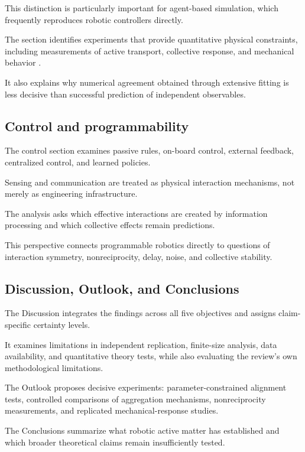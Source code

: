 This distinction is particularly important
for agent-based simulation, which frequently
reproduces robotic controllers directly.

The section identifies experiments
that provide quantitative physical
constraints, including measurements
of active transport, collective response,
and mechanical behavior
\cite{Tarcai2011patternstransition,Barone2024experimentalandnum,Zion2023morphologicalcomput,Binysh2026moreislessinunpe}.

It also explains why numerical agreement
obtained through extensive fitting
is less decisive than successful
prediction of independent observables.

\subsection*{Control and programmability}

The control section examines passive rules,
on-board control, external feedback,
centralized control, and learned policies.

Sensing and communication are treated
as physical interaction mechanisms,
not merely as engineering infrastructure.

The analysis asks which effective
interactions are created by
information processing and which
collective effects remain predictions.

This perspective connects programmable
robotics directly to questions of
interaction symmetry, nonreciprocity,
delay, noise, and collective stability.

\subsection*{Discussion, Outlook, and Conclusions}

The Discussion integrates the findings
across all five objectives and assigns
claim-specific certainty levels.

It examines limitations in independent
replication, finite-size analysis,
data availability, and quantitative
theory tests, while also evaluating
the review's own methodological limitations.

The Outlook proposes decisive experiments:
parameter-constrained alignment tests,
controlled comparisons of aggregation
mechanisms, nonreciprocity measurements,
and replicated mechanical-response studies.

The Conclusions summarize what robotic
active matter has established and
which broader theoretical claims
remain insufficiently tested.

